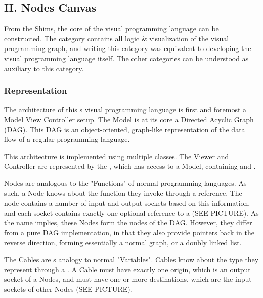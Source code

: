 \subsection*{II. Nodes Canvas}
From the Shims, the core of the visual programming language can be constructed. The  category contains all logic \& visualization of the visual programming graph, and writing this category was equivalent to developing the visual programming language itself. The other categories can be understood as auxiliary to this category.

\subsubsection*{ Representation }

The architecture of this \geofront{}s visual programming language is first and foremost a Model View Controller setup. The Model 
is at its core a Directed Acyclic Graph (DAG). 
This DAG is an object-oriented, graph-like representation of the data flow of a regular programming language. 

This architecture is implemented using multiple classes. The Viewer and Controller are represented by the , which has access to a  Model, containing  and . 

Nodes are analogous to the "Functions" of normal programming languages. 
As such, a Node knows about the function they invoke through a  reference. 
The node contains a number of input and output sockets based on this information, and each socket contains exactly one optional reference to a  (SEE PICTURE).  
As the name implies, these Nodes form the nodes of the DAG. However, they differ from a pure DAG implementation, in that they also provide pointers back in the reverse direction, forming essentially a normal graph, or a doubly linked list. 

The Cables are \geofront{}s analogy to normal "Variables". Cables know about the type they represent through a . A Cable must have exactly one origin, which is an output socket of a Nodes, and must have one or more destinations, which are the input sockets of other Nodes (SEE PICTURE).

